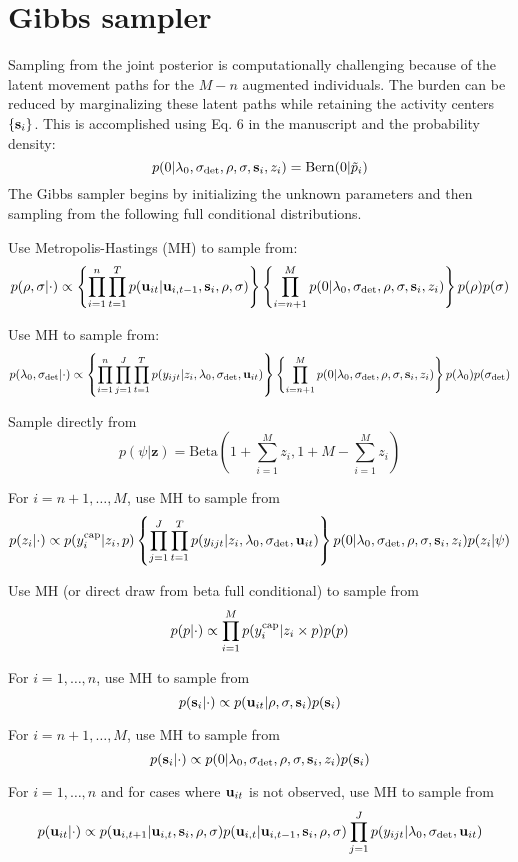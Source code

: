 \documentclass[12pt]{article}
\newcommand{\bsi}{{\bf s}_i}
\newcommand{\bu}{{\bf u}}
\newcommand{\buit}{{\bf u}_{it}}
\begin{document}
\clearpage

\section*{Gibbs sampler}

Sampling from the joint posterior is computationally challenging
because of the latent movement paths for the $M-n$ augmented
individuals. The burden can be reduced by marginalizing these latent
paths while retaining the activity centers $\{\bsi\}$. This is
accomplished using Eq. 6 in the manuscript and the probability density:
\[
  p(0|\lambda_0,\sigma_{\rm det},\rho,\sigma,\bsi,z_i) = \mathrm{Bern}(0|\tilde{p}_i)
\]
The Gibbs sampler begins by initializing the unknown parameters and
then sampling from the following full conditional distributions.

Use Metropolis-Hastings (MH) to sample from:
\[
  p(\rho,\sigma|\cdot) \propto \left\{\prod_{i=1}^n\prod_{t=1}^T
    p(\buit|\bu_{i,t-1},\bsi,\rho,\sigma)\right\}\left\{\prod_{i=n+1}^M p(0|\lambda_0,\sigma_{\rm det},\rho,\sigma,\bsi,z_i)\right\}p(\rho)p(\sigma)
\]

Use MH to sample from:
\[
  p(\lambda_0,\sigma_{\rm det}|\cdot) \propto \left\{\prod_{i=1}^n\prod_{j=1}^J\prod_{t=1}^T
    p(y_{ijt}|z_i,\lambda_0,\sigma_{\rm det},\buit)\right\}\left\{\prod_{i=n+1}^M
    p(0|\lambda_0,\sigma_{\rm det},\rho,\sigma,\bsi,z_i)\right\}p(\lambda_0)p(\sigma_{\rm det})
\]

Sample directly from
\[
  p(\psi|{\bm z}) = \mathrm{Beta}\left(1+\sum_{i=1}^M z_i, 1+M-\sum_{i=1}^M z_i\right)
\]

For $i=n+1,\dots,M$, use MH to sample from
\[
  p(z_i|\cdot) \propto p(y^{\rm cap}_i|z_i,p)
    \left\{\prod_{j=1}^J\prod_{t=1}^T p(y_{ijt}|z_i,\lambda_0,\sigma_{\rm
      det},\buit)\right\}
  p(0|\lambda_0,\sigma_{\rm det},\rho,\sigma,\bsi,z_i)p(z_i|\psi)
\]

Use MH (or direct draw from beta full conditional) to sample from
\[
  p(p|\cdot) \propto \prod_{i=1}^M p(y^{\rm cap}_i|z_i \times p)p(p)
\]

For $i=1,\dots,n$, use MH to sample from
\[
  p(\bsi|\cdot) \propto p(\buit|\rho,\sigma,\bsi)p(\bsi)
\]

For $i=n+1,\dots,M$, use MH to sample from
\[
  p(\bsi|\cdot) \propto p(0|\lambda_0,\sigma_{\rm det},\rho,\sigma,\bsi,z_i)p(\bsi)
\]

For $i=1,\dots,n$ and for cases where $\buit$ is not observed, use MH to sample from
\[
  p(\buit|\cdot) \propto
  p(\bu_{i,t+1}|\bu_{i,t},\bsi,\rho,\sigma)p(\bu_{i,t}|\bu_{i,t-1},\bsi,\rho,\sigma)\prod_{j=1}^J
  p(y_{ijt}|\lambda_0,\sigma_{\rm det},\buit)
\]
\end{document}
